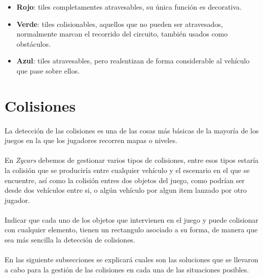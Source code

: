 \begin{itemize}
    \item \textbf{Rojo}: tiles completamentes atravesables, su única función es decorativa.
    
    \item \textbf{Verde}: tiles colisionables, aquellos que no pueden ser atravesados, normalmente marcan el recorrido
    del circuito, también usados como obstáculos.
    
    \item \textbf{Azul}: tiles atravesables, pero realentizan de forma considerable al vehículo que pase sobre ellos.
\end{itemize}

\section{Colisiones}

\paragraph{}
La detección de las colisiones es una de las cosas más básicas de la mayoría de los juegos en la que los jugadores
recorren mapas o niveles.

\paragraph{}
En \emph{Zycars} debemos de gestionar varios tipos de colisiones, entre esos tipos estaría la colisión que se produciría 
entre cualquier vehículo y el escenario en el que se encuentre, así como la colisión entres dos objetos del juego, como podrían
ser desde dos vehículos entre si, o algún vehículo por algun item lanzado por otro jugador.

\paragraph{}
Indicar que cada uno de los objetos que intervienen en el juego y puede colisionar con cualquier elemento, tienen
un rectangulo asociado a su forma, de manera que sea más sencilla la detección de colisiones.

\paragraph{}
En las siguiente subsecciones se explicará cuales son las soluciones que se llevaron a cabo para la gestión de las colisiones 
en cada una de las situaciones posibles.

